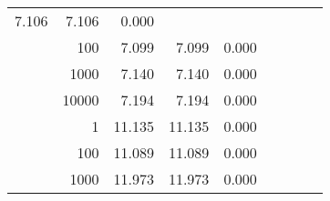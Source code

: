 \begin{table}
\begin{tabular}{rrrrrrrrr}
						
							    
							    
	                           7.106 & 7.106 & 0.000  \\
	                
	            
					 &  
					 
					\multirow{ 1 }{*}{ 100 } &
					
						
							    
							    
	                           7.099 & 7.099 & 0.000  \\
	                
	            
					 &  
					 
					\multirow{ 1 }{*}{ 1000 } &
					
						
							    
							    
	                           7.140 & 7.140 & 0.000  \\
	                
	            
					 &  
					 
					\multirow{ 1 }{*}{ 10000 } &
					
						
							    
							    
	                           7.194 & 7.194 & 0.000  \\
	                
	            
	        
				\noalign{\smallskip}\hline
				\multirow{ 4 }{*}{ 1000000 } &
				
					
					 
					\multirow{ 1 }{*}{ 1 } &
					
						
							    
							    
	                           11.135 & 11.135 & 0.000  \\
	                
	            
					 &  
					 
					\multirow{ 1 }{*}{ 100 } &
					
						
							    
							    
	                           11.089 & 11.089 & 0.000  \\
	                
	            
					 &  
					 
					\multirow{ 1 }{*}{ 1000 } &
					
						
							    
							    
	                           11.973 & 11.973 & 0.000  \\
	                

\end{tabular}
\end{table}
